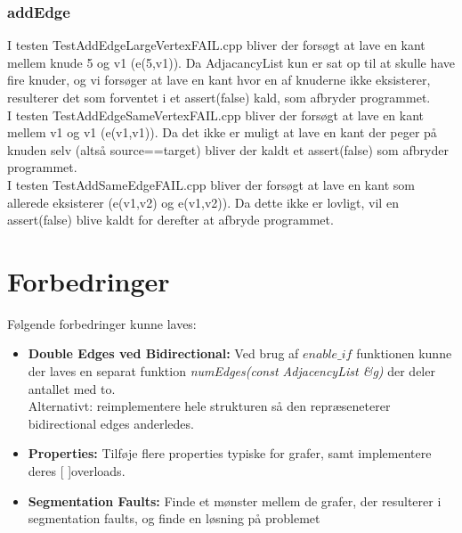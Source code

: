 \documentclass[a4paper,10pt,titlepage]{article}
\begin{document}
\subsubsection{addEdge}
I testen TestAddEdgeLargeVertexFAIL.cpp bliver der forsøgt at lave en kant mellem knude 5 og v1 (e(5,v1)). Da AdjacancyList kun er sat op til at skulle have fire knuder, og vi forsøger at lave en kant hvor en af knuderne ikke eksisterer, resulterer det som forventet i et assert(false) kald, som afbryder programmet.\\

I testen TestAddEdgeSameVertexFAIL.cpp bliver der forsøgt at lave en kant mellem v1 og v1 (e(v1,v1)). Da det ikke er muligt at lave en kant der peger på knuden selv (altså source==target) bliver der kaldt et assert(false) som afbryder programmet.\\

I testen TestAddSameEdgeFAIL.cpp bliver der forsøgt at lave en kant som allerede eksisterer (e(v1,v2) og e(v1,v2)). Da dette ikke er lovligt, vil en assert(false) blive kaldt for derefter at afbryde programmet.\\

\section{Forbedringer}
Følgende forbedringer kunne laves:
\begin{itemize}
\item
\textbf{Double Edges ved Bidirectional:} Ved brug af $enable\_if$ funktionen kunne der laves en separat funktion \textit{numEdges(const AdjacencyList \&g)} der deler antallet med to. \\Alternativt: reimplementere hele strukturen så den repræseneterer bidirectional edges anderledes.
\item
\textbf{Properties:} Tilføje flere properties typiske for grafer, samt implementere deres [ ]overloads.
\item
\textbf{Segmentation Faults:} Finde et mønster mellem de grafer, der resulterer i segmentation faults, og finde en løsning på problemet
\end{itemize}
\end{document}
